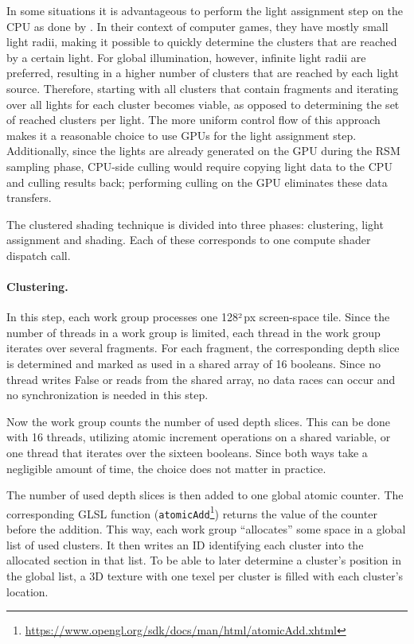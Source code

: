 In some situations it is advantageous to perform the light assignment step on the CPU as done by \citet{persson::2013::practical}. In their context of computer games, they have mostly small light radii, making it possible to quickly determine the clusters that are reached by a certain light. For global illumination, however, infinite light radii are preferred, resulting in a higher number of clusters that are reached by each light source. Therefore, starting with all clusters that contain fragments and iterating over all lights for each cluster becomes viable, as opposed to determining the set of reached clusters per light. The more uniform control flow of this approach makes it a reasonable choice to use GPUs for the light assignment step. Additionally, since the lights are already generated on the GPU during the RSM sampling phase, CPU-side culling would require copying light data to the CPU and culling results back; performing culling on the GPU eliminates these data transfers.


The clustered shading technique is divided into three phases: clustering, light assignment and shading. Each of these corresponds to one compute shader dispatch call.

\paragraph{Clustering.}
In this step, each work group processes one 128²\,px screen-space tile. Since the number of threads in a work group is limited, each thread in the work group iterates over several fragments. For each fragment, the corresponding depth slice is determined and marked as used in a shared array of 16 booleans. Since no thread writes False or reads from the shared array, no data races can occur and no synchronization is needed in this step.

Now the work group counts the number of used depth slices. This can be done with 16 threads, utilizing atomic increment operations on a shared variable, or one thread that iterates over the sixteen booleans. Since both ways take a negligible amount of time, the choice does not matter in practice.

The number of used depth slices is then added to one global atomic counter. The corresponding GLSL function (\texttt{atomicAdd}\footnote{\url{https://www.opengl.org/sdk/docs/man/html/atomicAdd.xhtml}}) returns the value of the counter before the addition. This way, each work group ``allocates'' some space in a global list of used clusters. It then writes an ID identifying each cluster into the allocated section in that list. To be able to later determine a cluster's position in the global list, a 3D texture with one texel per cluster is filled with each cluster's location.

